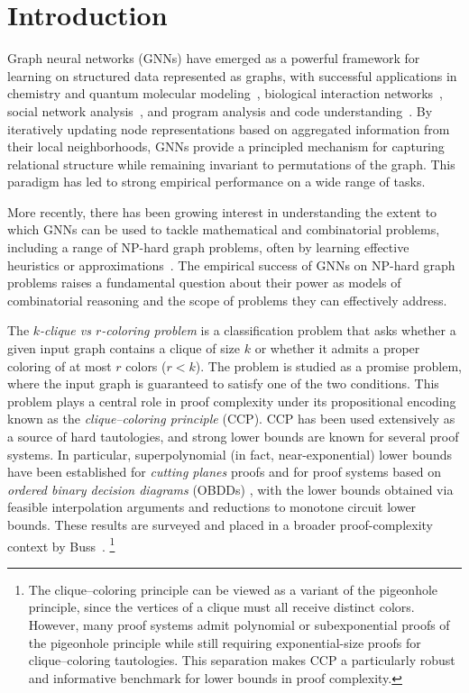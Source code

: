 \section{Introduction}
Graph neural networks (GNNs) have emerged as a powerful framework for learning on structured data represented as graphs, with successful applications in chemistry and quantum molecular modeling~\cite{GilmerEtAl2017,Kearnes2016}, biological interaction networks~\cite{Jha2022P}, social network analysis~\cite{Kipf2016,HamiltonEtAl2017}, and program analysis and code understanding~\cite{AllamanisEtAl2018,Allamanis2022GNNProgramAnalysis}.
By iteratively updating node representations based on aggregated information from their local neighborhoods, GNNs provide a principled mechanism for capturing relational structure while remaining invariant to permutations of the graph. This paradigm has led to strong empirical performance on a wide range of tasks.%

More recently, there has been growing interest in understanding the extent to which GNNs can be used to tackle mathematical and combinatorial problems, including a range of NP-hard graph problems, often by learning effective heuristics or approximations~\cite{He2025PrimalDualNA,Cappart2021CombinatorialOA,Prates2019}. The empirical success of GNNs on NP-hard graph problems raises a fundamental question about their power as models of combinatorial reasoning and the scope of problems they can effectively address.

The \emph{$k$-clique vs $r$-coloring problem} is a classification problem that asks whether a given input graph contains a clique of size $k$ or whether it admits a proper coloring of at most $r$ colors ($r < k$). The problem is studied as a promise problem, where the input graph is guaranteed to satisfy one of the two conditions. This problem plays a central role in proof complexity under its propositional encoding known as the \emph{clique--coloring principle} (CCP). CCP has been used extensively as a source of hard tautologies, and strong lower bounds are known for several proof systems. In particular, superpolynomial (in fact, near-exponential) lower bounds have been established for \emph{cutting planes} proofs \cite{Pavel1997} and for proof systems based on \emph{ordered binary decision diagrams} (OBDDs) \cite{Nathan2008,Jan2008}, with the lower bounds obtained via feasible interpolation arguments and reductions to monotone circuit lower bounds. These results are surveyed and placed in a broader proof-complexity context by Buss~\cite{BUSS2012906}.%
\footnote{The clique--coloring principle can be viewed as a variant of the pigeonhole principle, since the vertices of a clique must all receive distinct colors. However, many proof systems admit polynomial or subexponential proofs of the pigeonhole principle while still requiring exponential-size proofs for clique--coloring tautologies. This separation makes CCP a particularly robust and informative benchmark for lower bounds in proof complexity.}


